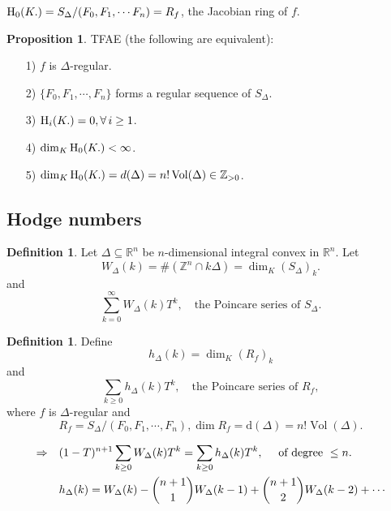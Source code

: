 \documentclass[a4paper,oneside,11pt]{article}
\theoremstyle{plain} \theoremstyle{definition}
\newtheorem{Prop}[Thm]{Proposition}
\newtheorem{Defn}[Thm]{Definition}
\theoremstyle{remark}
\newcommand{\Z}{\mathbb{Z}}
\newcommand{\R}{\mathbb{R}}
\newcommand{\h}{{\rm H}}
\newcommand{\vol}{\mathop{\mathrm{Vol}}}
\begin{document}
\qquad $\h_0(K.)=S_\Delta/(F_0,F_1,\cdots F_n)=R_f$, the Jacobian ring
of $f$.

\begin{Prop} \quad  TFAE (the following are equivalent):
\begin{enumerate}\item[1)]  $f$ is $\Delta$-regular.
\item[2)] $\{F_0,F_1,\cdots, F_n\}$ forms a regular sequence of
$S_\Delta$. \item[3)] $\h_i(K.)=0,\forall\, i\ge 1$.
\item[4)]$\dim_{K}\h_0(K.)<\infty $. \item[5)]$\dim_K
\h_0(K.)=d(\Delta)=n!\vol(\Delta)\in
\Z_{>0}$.\end{enumerate}\end{Prop}

\subsection{Hodge numbers}\vskip 3mm
\begin{Defn} Let $\Delta\subseteq\R^n$ be
$n$-dimensional integral convex in $\R^n$. Let
$$W_\Delta(k)=\#(\Z^n\cap k\Delta)=\dim_K(S_\Delta)_k.$$
and $$\sum_{k=0}^\infty W_\Delta(k)T^k,\quad \text{the Poincare
series of } S_\Delta.$$\end{Defn}

\begin{Defn}
Define$$h_\Delta(k)=\dim_K(R_f)_k$$ and $$\sum_{k\ge
0}h_\Delta(k)T^k,\quad \text{the Poincare series of $R_f$},$$
where $f$ is $\Delta$-regular and
$$R_f=S_\Delta\big/(F_0,F_1,\cdots,F_n), \dim
R_f=\text{d}(\Delta)=n!\vol(\Delta).$$\end{Defn}

$$\aligned\Rightarrow\quad &(1-T)^{n+1}\sum_{k\ge 0} W_\Delta(k)T^k=\sum_{k\ge
0}h_\Delta(k)T^k,\quad \text{ of degree }\le n.\\ &
h_\Delta(k)=W_\Delta(k)-{ n+1 \choose 1}W_\Delta(k-1)+{n+1\choose
2}W_\Delta(k-2)+\cdots\endaligned$$
\end{document}
